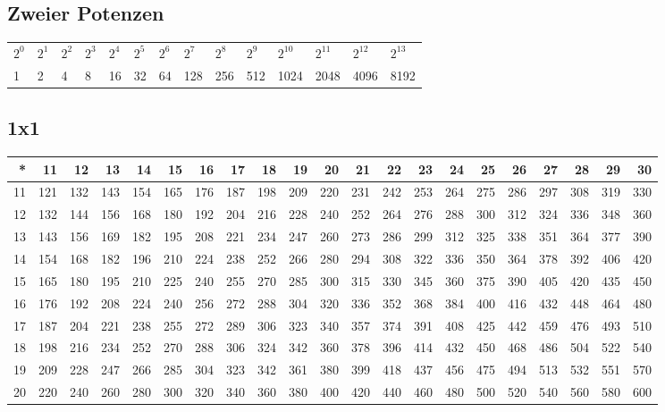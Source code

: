 \documentclass[landscape,twocolumn,a4paper]{article}
\begin{document}
\subsection{Zweier Potenzen}
\begin{tabular}{l l l l l l l l l l l l l l}
$2^0$ & $2^1$ & $2^2$ & $2^3$ & $2^4$ & $2^5$ & $2^6$ & $2^7$ & $2^8$ & $2^9$ & $2^{10}$ & $2^{11}$ & $2^{12}$ & $2^{13}$
\\ 
1 & 2 & 4 & 8 & 16 & 32 & 64 & 128 & 256 & 512 & 1024 & 2048 & 4096 & 8192
\\
\end{tabular}
\subsection{1x1}
\setlength{\tabcolsep}{0.15em}
\begin{tabular}{r||r|r|r|r|r|r|r|r|r|r|r|r|r|r|r|r|r|r|r|r}
* & 11 & 12 & 13 & 14 & 15 & 16 & 17 & 18 & 19 & 20 & 21 & 22 & 23 & 24 & 25 & 26 & 27 & 28 & 29 & 30 \\\hline
11 & 121 & 132 & 143 & 154 & 165 & 176 & 187 & 198 & 209 & 220 & 231 & 242 & 253 & 264 & 275 & 286 & 297 & 308 & 319 & 330
\\ 
12 & 132 & 144 & 156 & 168 & 180 & 192 & 204 & 216 & 228 & 240 & 252 & 264 & 276 & 288 & 300 & 312 & 324 & 336 & 348 & 360
\\ 
13 & 143 & 156 & 169 & 182 & 195 & 208 & 221 & 234 & 247 & 260 & 273 & 286 & 299 & 312 & 325 & 338 & 351 & 364 & 377 & 390
\\ 
14 & 154 & 168 & 182 & 196 & 210 & 224 & 238 & 252 & 266 & 280 & 294 & 308 & 322 & 336 & 350 & 364 & 378 & 392 & 406 & 420
\\ 
15 & 165 & 180 & 195 & 210 & 225 & 240 & 255 & 270 & 285 & 300 & 315 & 330 & 345 & 360 & 375 & 390 & 405 & 420 & 435 & 450
\\ 
16 & 176 & 192 & 208 & 224 & 240 & 256 & 272 & 288 & 304 & 320 & 336 & 352 & 368 & 384 & 400 & 416 & 432 & 448 & 464 & 480
\\ 
17 & 187 & 204 & 221 & 238 & 255 & 272 & 289 & 306 & 323 & 340 & 357 & 374 & 391 & 408 & 425 & 442 & 459 & 476 & 493 & 510
\\ 
18 & 198 & 216 & 234 & 252 & 270 & 288 & 306 & 324 & 342 & 360 & 378 & 396 & 414 & 432 & 450 & 468 & 486 & 504 & 522 & 540
\\ 
19 & 209 & 228 & 247 & 266 & 285 & 304 & 323 & 342 & 361 & 380 & 399 & 418 & 437 & 456 & 475 & 494 & 513 & 532 & 551 & 570
\\ 
20 & 220 & 240 & 260 & 280 & 300 & 320 & 340 & 360 & 380 & 400 & 420 & 440 & 460 & 480 & 500 & 520 & 540 & 560 & 580 & 600

\end{tabular}
\end{document}
